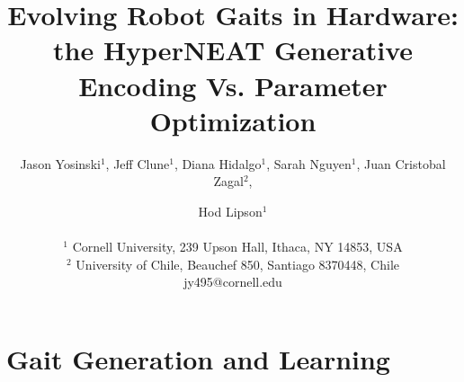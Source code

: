 \documentclass[letterpaper]{article}
\title{Evolving Robot Gaits in Hardware: the HyperNEAT Generative Encoding Vs. Parameter Optimization}
\author {Jason Yosinski$^{1}$,
Jeff Clune$^{1}$,
Diana Hidalgo$^{1}$,
Sarah Nguyen$^{1}$,
Juan Cristobal Zagal$^{2}$,
\and Hod Lipson$^{1}$\\
\mbox{} \\
$^1$ Cornell University, 239 Upson Hall, Ithaca, NY  14853, USA\\
$^2$ University of Chile, Beauchef 850, Santiago 8370448, Chile\\
jy495@cornell.edu}
\begin{document}
\maketitle

\begin{abstract}

\end{abstract}




%







\section{Gait Generation and Learning}











\footnotesize


\end{document}
